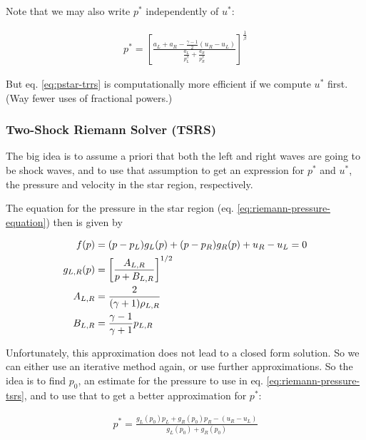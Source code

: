 Note that we may also write $p^*$ independently of $u^*$:

\begin{align}
	p^* = 
		\left[ 
			\frac{ a_L + a_R - \frac{\gamma - 1}{2} (u_R - u_L)}{\frac{a_L}{p_L^\beta} + \frac{a_R}{p_R^\beta}}
		\right] ^ \frac{1}{\beta}
\end{align}

But eq. \ref{eq:pstar-trrs} is computationally more efficient if we compute $u^*$ first. (Way fewer uses of fractional powers.)















\subsubsection{Two-Shock Riemann Solver (TSRS)}


The big idea is to assume a priori that both the left and right waves are going to be shock waves, and to use that assumption to get an expression for $p^*$ and $u^*$, the pressure and velocity in the star region, respectively.


The equation for the pressure in the star region (eq. \ref{eq:riemann-pressure-equation}) then is given by

\begin{align}
	f(p) &= (p - p_L) g_L(p) + (p - p_R) g_R(p) + u_R - u_L = 0 \label{eq:riemann-pressure-tsrs} \\
	g_{L,R}(p) &= \left[ \frac{A_{L,R}}{p + B_{L,R}} \right] ^{1/2} \\
	A_{L,R} &= 
		\frac{2}{(\gamma + 1) \rho_{L,R}}\\
	B_{L,R} &= 
		\frac{\gamma - 1}{\gamma + 1} p_{L,R}
\end{align}

Unfortunately, this approximation does not lead to a closed form solution.
So we can either use an iterative method again, or use further approximations.
So the idea is to find $p_0$, an estimate for the pressure to use in eq. \ref{eq:riemann-pressure-tsrs}, and to use that to get a better approximation for $p^*$:

\begin{align}
	p^* = \frac{g_L(p_0) p_L + g_R(p_0)p_R - (u_R - u_L)}{g_L(p_0) + g_R(p_0)} \label{eq:pstar-tsrs}
\end{align}

